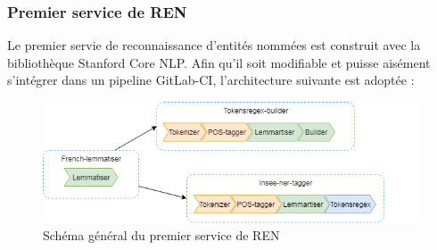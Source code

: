 \subsubsection{Premier service de REN}
Le premier servie de reconnaissance d'entités nommées est construit avec la bibliothèque Stanford Core NLP. Afin qu'il soit modifiable et puisse aisément s'intégrer dans un pipeline GitLab-CI, l'architecture suivante est adoptée :

\begin{figure}[H]
    \centering
    \includegraphics[scale=0.72]{images/Concept-tagger.png}
    \caption{Schéma général du premier service de REN}
    \label{fig:premier-pipeline}
\end{figure}
\vspace{10pt}

